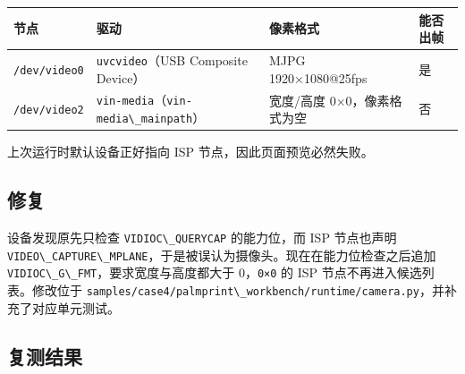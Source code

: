 \begin{longtable}[]{@{}
  >{\raggedright\arraybackslash}p{}
  >{\raggedright\arraybackslash}p{}
  >{\raggedright\arraybackslash}p{}
  >{\raggedright\arraybackslash}p{}@{}}
\toprule\noalign{}
\begin{minipage}[b]{\linewidth}\raggedright
节点
\end{minipage} & \begin{minipage}[b]{\linewidth}\raggedright
驱动
\end{minipage} & \begin{minipage}[b]{\linewidth}\raggedright
像素格式
\end{minipage} & \begin{minipage}[b]{\linewidth}\raggedright
能否出帧
\end{minipage} \\
\midrule\noalign{}
\endhead
\bottomrule\noalign{}
\endlastfoot
\passthrough{\lstinline!/dev/video0!} &
\passthrough{\lstinline!uvcvideo!}（USB Composite Device） & MJPG
1920×1080@25fps & 是 \\
\passthrough{\lstinline!/dev/video2!} &
\passthrough{\lstinline!vin-media!}（\passthrough{\lstinline!vin-media\_mainpath!}）
& 宽度/高度 0×0，像素格式为空 & 否 \\
\end{longtable}

上次运行时默认设备正好指向 ISP 节点，因此页面预览必然失败。

\subsection{修复}\label{ux4feeux590d}

设备发现原先只检查 \passthrough{\lstinline!VIDIOC\_QUERYCAP!}
的能力位，而 ISP 节点也声明
\passthrough{\lstinline!VIDEO\_CAPTURE\_MPLANE!}，于是被误认为摄像头。现在在能力位检查之后追加
\passthrough{\lstinline!VIDIOC\_G\_FMT!}，要求宽度与高度都大于
0，\passthrough{\lstinline!0×0!} 的 ISP 节点不再进入候选列表。修改位于
\passthrough{\lstinline!samples/case4/palmprint\_workbench/runtime/camera.py!}，并补充了对应单元测试。

\subsection{复测结果}\label{ux590dux6d4bux7ed3ux679c}

